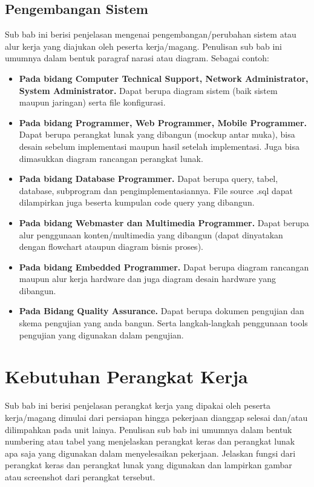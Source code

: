 \documentclass[a4paper,11pt,oneside]{report}
\begin{document}
\subsection{Pengembangan Sistem}
Sub bab ini berisi penjelasan mengenai pengembangan/perubahan sistem atau alur
kerja yang diajukan oleh peserta kerja/magang. Penulisan sub bab ini umumnya
dalam bentuk paragraf narasi atau diagram. Sebagai contoh:

\begin{itemize}
    \item \textbf{Pada bidang Computer Technical Support, Network Administrator,
    System Administrator.} Dapat berupa diagram sistem (baik sistem maupun
    jaringan) serta file konfigurasi.
    \item \textbf{Pada bidang Programmer, Web Programmer, Mobile Programmer.}
    Dapat berupa perangkat lunak yang dibangun (mockup antar muka), bisa desain
    sebelum implementasi maupun hasil setelah implementasi. Juga bisa dimasukkan
    diagram rancangan perangkat lunak.
    \item \textbf{Pada bidang Database Programmer.} Dapat berupa query, tabel,
    database, subprogram dan pengimplementasiannya. File source .sql dapat
    dilampirkan juga beserta kumpulan code query yang dibangun.
    \item \textbf{Pada bidang Webmaster dan Multimedia Programmer.} Dapat berupa
    alur penggunaan konten/multimedia yang dibangun (dapat dinyatakan dengan
    flowchart ataupun diagram bisnis proses).
    \item \textbf{Pada bidang Embedded Programmer.} Dapat berupa diagram
    rancangan maupun alur kerja hardware dan juga diagram desain hardware yang
    dibangun.
    \item \textbf{Pada Bidang Quality Assurance.} Dapat berupa dokumen pengujian
    dan skema pengujian yang anda bangun. Serta langkah-langkah penggunaan tools
    pengujian yang digunakan dalam pengujian.
\end{itemize}

\section{Kebutuhan Perangkat Kerja}
Sub bab ini berisi penjelasan perangkat kerja yang dipakai oleh peserta
kerja/magang dimulai dari persiapan hingga pekerjaan dianggap selesai dan/atau
dilimpahkan pada unit lainya. Penulisan sub bab ini umumnya dalam bentuk
numbering atau tabel yang menjelaskan perangkat keras dan perangkat lunak apa
saja yang digunakan dalam menyelesaikan pekerjaan. Jelaskan fungsi dari perangkat
keras dan perangkat lunak yang digunakan dan lampirkan gambar atau screenshot
dari perangkat tersebut.
\end{document}
